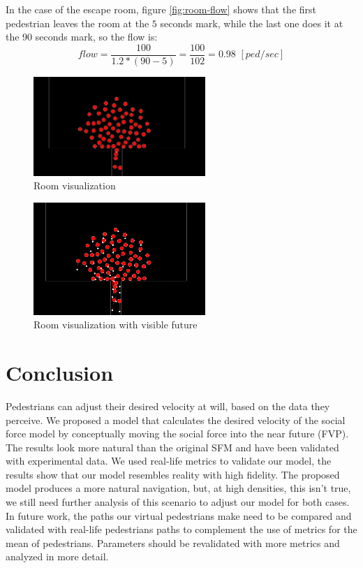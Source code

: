 \documentclass[english]{article}
\begin{document}
In the case of the escape room, figure \ref{fig:room-flow} shows
that the first pedestrian leaves the room at the $5$ seconds mark,
while the last one does it at the $90$ seconds mark, so the flow
is: 
\[
    flow=\frac{100}{1.2*(90-5)}=\frac{100}{102}=0.98\,\,[ped/sec]
\]


\begin{figure}[h]
    \begin{centering}
    \includegraphics[width=6.5cm]{pics/program/room-no-future} 
    \par\end{centering}
    
    \caption{\label{fig:room-no-future} Room visualization}
\end{figure}


\begin{figure}[h]
    \centering{} \includegraphics[width=6.5cm]{pics/program/room-future}
    \caption{\label{fig:room-future} Room visualization with visible future}
\end{figure}

\section{Conclusion}

Pedestrians can adjust their desired velocity at will, based on the
data they perceive. We proposed a model that calculates the desired
velocity of the social force model by conceptually moving the social
force into the near future (FVP). The results look more natural than
the original SFM and have been validated with experimental data. We
used real-life metrics to validate our model, the results show that
our model resembles reality with high fidelity. The proposed model
produces a more natural navigation, but, at high densities, this isn't
true, we still need further analysis of this scenario to adjust our
model for both cases. In future work, the paths our virtual pedestrians
make need to be compared and validated with real-life pedestrians
paths to complement the use of metrics for the mean of pedestrians.
Parameters should be revalidated with more metrics and analyzed in
more detail.
\end{document}
